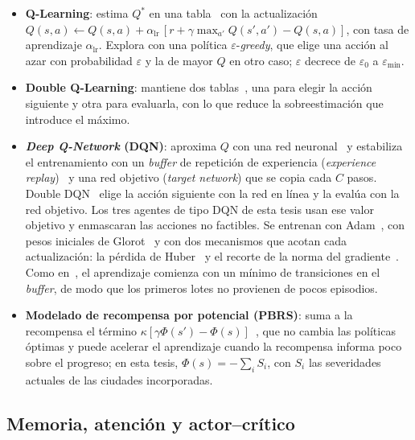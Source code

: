 \documentclass[../00_Main/Main.tex]{subfiles}
\begin{document}
\begin{itemize}
    \item \textbf{Q-Learning}: estima $Q^{*}$ en una
    tabla~\citep{Watkins1992} con la actualizaci\'on $Q(s,a) \leftarrow
    Q(s,a) + \alpha_{\mathrm{lr}}\,[r + \gamma \max_{a'} Q(s',a') -
    Q(s,a)]$, con tasa de aprendizaje $\alpha_{\mathrm{lr}}$. Explora
    con una pol\'itica $\varepsilon$-\emph{greedy}, que elige una acci\'on
    al azar con probabilidad $\varepsilon$ y la de mayor $Q$ en otro caso;
    $\varepsilon$ decrece de $\varepsilon_0$ a $\varepsilon_{\min}$.
    \item \textbf{Double Q-Learning}: mantiene dos
    tablas~\citep{Hasselt2010}, una para elegir la acci\'on siguiente y
    otra para evaluarla, con lo que reduce la sobreestimaci\'on que
    introduce el m\'aximo.
    \item \textbf{\emph{Deep Q-Network} (DQN)}: aproxima $Q$ con una red
    neuronal~\citep{Mnih2015} y estabiliza el entrenamiento con un
    \emph{buffer} de repetici\'on de experiencia (\emph{experience
    replay})~\citep{Lin1992} y una red objetivo (\emph{target network})
    que se copia cada $C$ pasos. Double DQN~\citep{Hasselt2016} elige la
    acci\'on siguiente con la red en l\'inea y la eval\'ua con la red
    objetivo. Los tres agentes de tipo DQN de esta tesis usan ese valor
    objetivo y enmascaran las acciones no factibles. Se entrenan con Adam~\citep{Kingma2015}, con pesos
    iniciales de Glorot~\citep{Glorot2010} y con dos mecanismos que acotan
    cada actualizaci\'on: la p\'erdida de Huber~\citep{Huber1964} y el
    recorte de la norma del gradiente~\citep{Pascanu2013}. Como
    en~\citep{Mnih2015}, el aprendizaje comienza con un m\'inimo de
    transiciones en el \emph{buffer}, de modo que los primeros lotes no
    provienen de pocos episodios.
    \item \textbf{Modelado de recompensa por potencial (PBRS)}: suma a la
    recompensa el t\'ermino $\kappa[\gamma\Phi(s')-\Phi(s)]$~\citep{Ng1999},
    que no cambia las pol\'iticas \'optimas y puede acelerar el
    aprendizaje cuando la recompensa informa poco sobre el progreso; en
    esta tesis, $\Phi(s) = -\sum_i S_i$, con $S_i$ las severidades
    actuales de las ciudades incorporadas.
\end{itemize}

\subsection{Memoria, atenci\'on y actor--cr\'itico}\label{sec:memory-bg}
\end{document}
